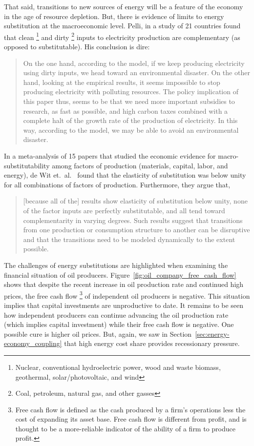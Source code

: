 That said, transitions to new sources of energy will be a feature 
of the economy in the age of resource depletion.
But, there is evidence of limits to energy substitution 
at the macroeconomic level.
Pelli, in a study of 21 countries 
found that clean%
	\footnote{
	Nuclear, 
	conventional hydroelectric power, wood and waste biomass, 
	geothermal, solar/photovoltaic, and wind
	}
and dirty%
	\footnote{
	Coal, 
	petroleum, natural gas, and other gasses
	}
inputs to electricity production
are complementary (as opposed to substitutable).\cite{Pelli:2012wv}
His conclusion is dire:
%
\begin{quote}
	On the one hand, according to the model, 
	if we keep producing electricity using dirty inputs, 
	we head toward an environmental disaster. 
	On the other hand, looking at the empirical results, 
	it seems impossible to stop producing electricity with polluting resources. 
	The policy implication of this paper thus, 
	seems to be that we need more important subsidies to research, 
	as fast as possible, 
	and high carbon taxes combined with a complete halt 
	of the growth rate of the production of electricity. 
	In this way, according to the model, 
	we may be able to avoid an environmental disaster.\cite[p.~25]{Pelli:2012wv}
\end{quote}

In a meta-analysis of 15 papers that studied 
the economic evidence for macro-substitutability
among factors of production (materials, capital, labor, and energy), 
de Wit et.\ al.~\cite{de-Wit:2013aa} found that the elasticity of substitution was 
below unity for all combinations of factors of production.
Furthermore, they argue that, 
%
\begin{quote}
	[because all of the] results show elasticity of substitution below unity, 
	none of the factor inputs are perfectly substitutable, and 
	all tend toward complementarity in varying degrees. 
	Such results suggest that transitions 
	from one production or consumption structure to another 
	can be disruptive and that the transitions 
	need to be modeled dynamically to the extent possible.\cite[p.~8]{de-Wit:2013aa}
\end{quote}

The challenges of energy substitutions are highlighted
when examining the financial situation of oil producers.
Figure~\ref{fig:oil_company_free_cash_flow} 
shows that despite the recent increase in oil production rate
and continued high prices, 
the free cash flow%
	\footnote{
	Free cash flow is defined as the cash produced by a firm's operations
	less the cost of expanding its asset base. 
	Free cash flow is different from profit,
	and is thought to be a more-reliable indicator of the ability of a firm
	to produce profit.
	}
of independent oil producers is negative.
This situation implies that capital investments are unproductive to date.
It remains to be seen how independent producers 
can continue advancing the oil production rate (which implies capital investment)
while their free cash flow is negative.
One possible cure is higher oil prices.
But, again, we saw 
in Section~\ref{sec:energy-economy_coupling}
that high energy cost share 
provides recessionary pressure.

